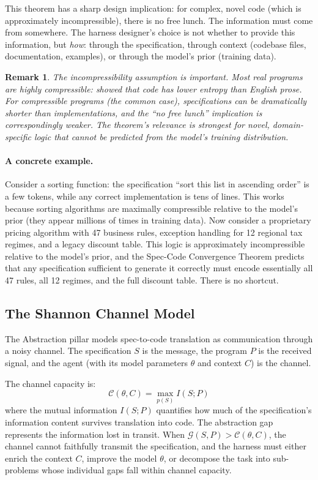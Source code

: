 \documentclass[11pt, a4paper]{googledeepmind}
\newtheorem*{remark}{Remark}
\begin{document}
This theorem has a sharp design implication: for complex, novel code (which is approximately incompressible), there is no free lunch. The information must come from somewhere. The harness designer's choice is not whether to provide this information, but \emph{how}: through the specification, through context (codebase files, documentation, examples), or through the model's prior (training data).

\begin{remark}
The incompressibility assumption is important. Most real programs are highly compressible: \citet{hindle2012naturalness} showed that code has lower entropy than English prose. For compressible programs (the common case), specifications can be dramatically shorter than implementations, and the ``no free lunch'' implication is correspondingly weaker. The theorem's relevance is strongest for novel, domain-specific logic that cannot be predicted from the model's training distribution.
\end{remark}

\paragraph{A concrete example.} Consider a sorting function: the specification ``sort this list in ascending order'' is a few tokens, while any correct implementation is tens of lines. This works because sorting algorithms are maximally compressible relative to the model's prior (they appear millions of times in training data). Now consider a proprietary pricing algorithm with 47 business rules, exception handling for 12 regional tax regimes, and a legacy discount table. This logic is approximately incompressible relative to the model's prior, and the Spec-Code Convergence Theorem predicts that any specification sufficient to generate it correctly must encode essentially all 47 rules, all 12 regimes, and the full discount table. There is no shortcut.

\subsection{The Shannon Channel Model}

The Abstraction pillar models spec-to-code translation as communication through a noisy channel. The specification $S$ is the message, the program $P$ is the received signal, and the agent (with its model parameters $\theta$ and context $C$) is the channel.

The channel capacity is:
\begin{equation}
    \mathcal{C}(\theta, C) = \max_{p(S)} I(S; P)
\end{equation}
where the mutual information $I(S; P)$ quantifies how much of the specification's information content survives translation into code. The abstraction gap represents the information lost in transit. When $\mathcal{G}(S, P) > \mathcal{C}(\theta, C)$, the channel cannot faithfully transmit the specification, and the harness must either enrich the context $C$, improve the model $\theta$, or decompose the task into sub-problems whose individual gaps fall within channel capacity.
\end{document}
